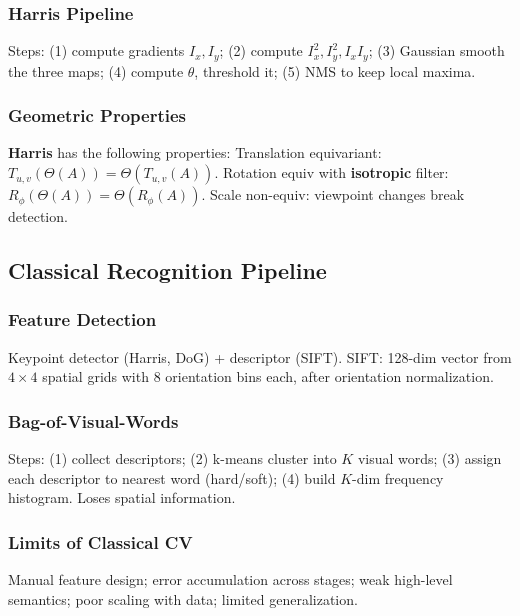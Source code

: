 \subsubsection*{Harris Pipeline}
Steps: (1) compute gradients $I_x,I_y$; (2) compute $I_x^2,I_y^2,I_xI_y$; (3) Gaussian smooth the three maps; (4) compute $\theta$, threshold it; (5) NMS to keep local maxima.

\subsubsection*{Geometric Properties}
\textbf{Harris} has the following properties:
Translation equivariant: $T_{u,v}(\Theta(A))=\Theta(T_{u,v}(A))$.
Rotation equiv with \textbf{isotropic} filter: $R_\phi(\Theta(A))=\Theta(R_\phi(A))$.
Scale non-equiv: viewpoint changes break detection.

\subsection{Classical Recognition Pipeline}
\subsubsection*{Feature Detection}
Keypoint detector (Harris, DoG) + descriptor (SIFT). SIFT: 128-dim vector from $4\times4$ spatial grids with 8 orientation bins each, after orientation normalization.

\subsubsection*{Bag-of-Visual-Words}
Steps: (1) collect descriptors; (2) k-means cluster into $K$ visual words; (3) assign each descriptor to nearest word (hard/soft); (4) build $K$-dim frequency histogram.
Loses spatial information.

\subsubsection*{Limits of Classical CV}
Manual feature design; error accumulation across stages; weak high-level semantics; poor scaling with data; limited generalization.
